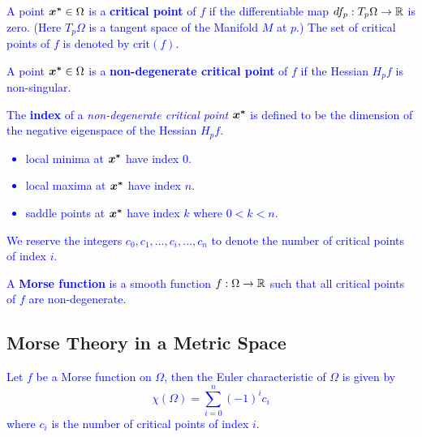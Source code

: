 \documentclass[10pt]{article}
\begin{document}
\begin{definition}
    \textcolor{blue}{
        A point $\bm{x^*} \in \Omega$ is a \textbf{critical point} of $f$ if the
        differentiable map $df_p: T_p \Omega \rightarrow \mathbb{R}$ is zero. (Here
        $T_p \Omega$ is a tangent space of the Manifold $M$ at $p$.) 
        The set of critical points of $f$ is denoted by $\text{crit}(f)$.
    }
\end{definition}

\begin{definition}
    \textcolor{blue}{
        A point $\bm{x^*} \in \Omega$ is a \textbf{non-degenerate critical point} of $f$ if
        the Hessian $H_p f$ is non-singular.
    }
\end{definition}

\begin{definition}
    \textcolor{blue}{
        The \textbf{index} of a \emph{non-degenerate critical point} $\bm{x^*}$ is defined to be
        the dimension of the negative eigenspace of the Hessian $H_p f$.
        \begin{itemize}
            \item local minima at $\bm{x^*}$ have index $0$.
            \item local maxima at $\bm{x^*}$ have index $n$.
            \item saddle points at $\bm{x^*}$ have index $k$ where $0 < k < n$.
        \end{itemize}
        We reserve the integers $c_0, c_1, \dots, c_i, \dots, c_n$ to denote the number of
        critical points of index $i$.
    }
\end{definition}

\begin{definition}
    \textcolor{blue}{
        A \textbf{Morse function} is a smooth function $f : \Omega \rightarrow \mathbb{R}$ such that
        all critical points of $f$ are non-degenerate.
    }
\end{definition}

\subsection{Morse Theory in a Metric Space}

\begin{theorem}
    \textcolor{Blue}{
        Let $f$ be a Morse function on $\Omega$, then the Euler characteristic of $\Omega$ is
        given by
        $$
            \chi(\Omega) = \sum_{i=0}^n (-1)^i c_i
        $$
        where $c_i$ is the number of critical points of index $i$.
    }
\end{theorem}
\end{document}
